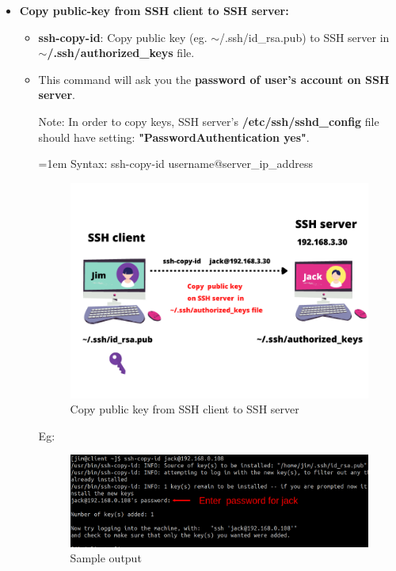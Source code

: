 \begin{flushleft}
\begin{itemize}
		
	\newpage
	
	\item \textbf{Copy public-key from SSH client to SSH server:}
	\begin{itemize}
		\item \textbf{ssh-copy-id}: Copy public key (eg. $\sim$/.ssh/id\_rsa.pub) to SSH server in \textbf{$\sim$/.ssh/authorized\_keys} file.
		\item This command will ask you the \textbf{password of user's account on SSH server}.
		\bigskip
		\begin{tcolorbox}[breakable,notitle,boxrule=-0pt,colback=yellow,colframe=yellow]
			\color{black}
			Note: In order to copy keys, SSH server's \textbf{/etc/ssh/sshd\_config}  file should have setting:  \textbf{"PasswordAuthentication yes"}. 
		\end{tcolorbox}
		
		\bigskip
		\begin{tcolorbox}[breakable,notitle,boxrule=0pt,colback=pink,colframe=pink]
			\color{black}
			\font=1em
			Syntax: ssh-copy-id  username@server\_ip\_address
			\font=4pt
		\end{tcolorbox}
		
		\begin{figure}[h!]
			\centering
			\includegraphics[scale=0.4]{content/chapter19/images/ssh01.png}
			\caption{Copy public key from SSH client to SSH server}
			\label{fig:stage556}
		\end{figure}
			
		Eg:
		\begin{figure}[h!]
			\centering
			\includegraphics[scale=0.25]{content/chapter19/images/ssh09.png}
			\caption{Sample output}
			\label{fig:stage5569}
		\end{figure}


\end{itemize}
\end{itemize}
\end{flushleft}
